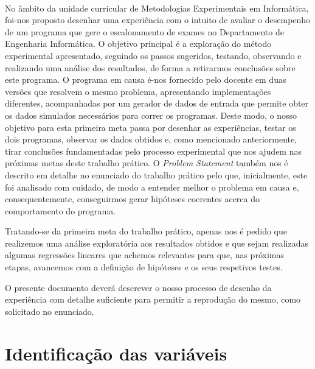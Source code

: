 \documentclass{article}
\begin{document}
\paragraph{}
No âmbito da unidade curricular de Metodologias Experimentais em Informática, foi-nos proposto desenhar uma experiência com o intuito de avaliar o desempenho de um programa que gere o escalonamento de exames no Departamento de Engenharia Informática.
O objetivo principal é a exploração do método experimental apresentado, seguindo os passos sugeridos, testando, observando e realizando uma análise dos resultados, de forma a retirarmos conclusões sobre este programa. O programa em causa é-nos fornecido pelo docente em duas versões que resolvem o mesmo problema, apresentando implementações diferentes, acompanhadas por um gerador de dados de entrada que permite obter os dados simulados necessários para correr os programas. Deste modo, o nosso objetivo para esta primeira meta passa por desenhar as experiências, testar os dois programas, observar os dados obtidos e, como mencionado anteriormente, tirar conclusões fundamentadas pelo processo experimental que nos ajudem nas próximas metas deste trabalho prático. O \textit{Problem Statement} também nos é descrito em detalhe no enunciado do trabalho prático pelo que, inicialmente, este foi analisado com cuidado, de modo a entender melhor o problema em causa e, consequentemente, conseguirmos gerar hipóteses coerentes acerca do comportamento do programa.\par
Tratando-se da primeira meta do trabalho prático, apenas nos é pedido que realizemos uma análise exploratória aos resultados obtidos e que sejam realizadas algumas regressões lineares que achemos relevantes para que, nas próximas etapas, avancemos com a definição de hipóteses e os seus respetivos testes.\par
O presente documento deverá descrever o nosso processo de desenho da experiência com detalhe suficiente para permitir a reprodução do mesmo, como solicitado no enunciado.



\section{Identificação das variáveis}
\end{document}
